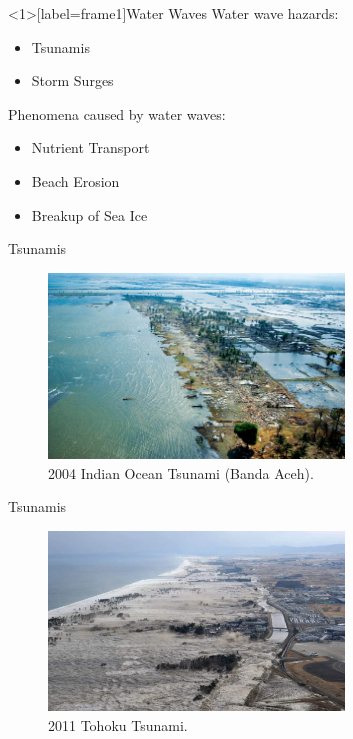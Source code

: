 \documentclass[]{beamer}
\begin{document}
\begin{frame}<1>[label=frame1]{Water Waves}
	\pause
	Water wave hazards:
	\begin{itemize}
		\item Tsunamis
		\pause
		\item Storm Surges
		\pause
	\end{itemize}
	\smallskip
	Phenomena caused by water waves:
	\begin{itemize}
		\item Nutrient Transport
		\item Beach Erosion
		\item Breakup of Sea Ice
	\end{itemize}
\end{frame}
\begin{frame}{Tsunamis}
	\begin{figure}
		\includegraphics[width=0.7\textwidth]{./Pics/Examples/Coast_of_Banda_Aceh_2-12-05_050212-N-1450G-012.png}
		\caption{2004 Indian Ocean Tsunami (Banda Aceh).}
	\end{figure}
\end{frame}
\begin{frame}{Tsunamis}
	\begin{figure}
	\includegraphics[width=0.7\textwidth]{./Pics/Examples/Tohoku-Tsunami.jpg}
	\caption{2011 Tohoku Tsunami.}
	\end{figure}
\end{frame}
\end{document}
